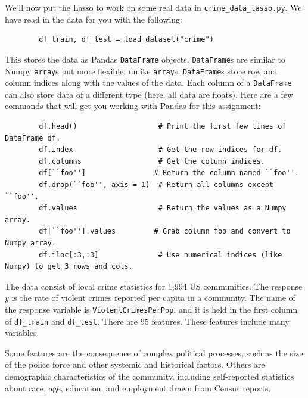 \documentclass{article}
\begin{document}
\begin{aprob}
    \label{crime} 
    We'll now put the Lasso to work on some real data in \texttt{crime\_data\_lasso.py}. We have read in the data for you with the following:
    
    \begin{verbatim}
        df_train, df_test = load_dataset("crime")
    \end{verbatim}

    This stores the data as Pandas \texttt{DataFrame} objects. \texttt{DataFrame}s are similar to Numpy \texttt{array}s but more flexible; unlike \texttt{array}s, \texttt{DataFrame}s store row and column indices along with the values of the data. Each column of a \texttt{DataFrame} can also store data of a different type (here, all data are floats). 
    Here are a few commands that will get you working with Pandas for this assignment:

    \begin{verbatim}
        df.head()                   # Print the first few lines of DataFrame df.
        df.index                    # Get the row indices for df.
        df.columns                  # Get the column indices.
        df[``foo'']                # Return the column named ``foo''.
        df.drop(``foo'', axis = 1)  # Return all columns except ``foo''.
        df.values                   # Return the values as a Numpy array.
        df[``foo''].values         # Grab column foo and convert to Numpy array.
        df.iloc[:3,:3]              # Use numerical indices (like Numpy) to get 3 rows and cols.
    \end{verbatim}

    The data consist of local crime statistics for 1,994 US
    communities. The response $y$ is the rate of violent crimes reported per capita in a community. The name of the response variable is \texttt{ViolentCrimesPerPop}, and it is held in the first column of \texttt{df\_train} and \texttt{df\_test}. There are 95 features. These
    features include many variables.
    
    Some features are the consequence of complex political processes, such as the size of the police force and other systemic and historical factors. Others are demographic
    characteristics of the community, including self-reported statistics about race, age, education, and employment drawn from Census reports.\\
    

\end{aprob}
\end{document}
